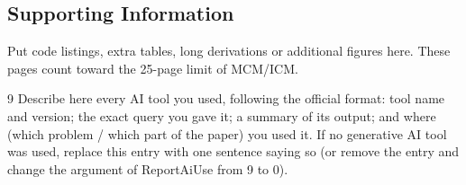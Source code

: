 %
%
\begin{appendices}

\section{Supporting Information}
\label{app:si}

Put code listings, extra tables, long derivations or additional figures
here. These pages count toward the 25-page limit of MCM/ICM.

\end{appendices}

\AImatter

\begin{ReportAiUse}{9}
Describe here every AI tool you used, following the official format:
tool name and version; the exact query you gave it; a summary of its
output; and where (which problem / which part of the paper) you used it.
If no generative AI tool was used, replace this entry with one sentence
saying so (or remove the entry and change the argument of ReportAiUse
from 9 to 0).
\end{ReportAiUse}
